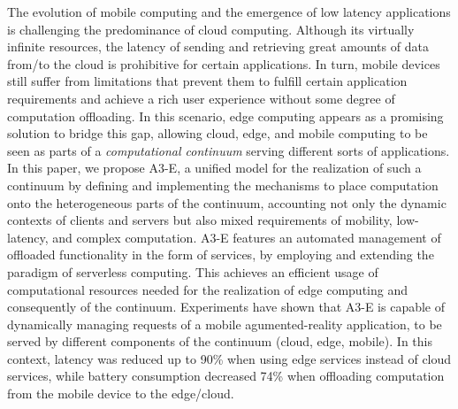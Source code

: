 
The evolution of mobile computing and the emergence of low latency applications is challenging the predominance of cloud computing.
Although its virtually infinite resources, the latency of sending and retrieving great amounts of data from/to the cloud is prohibitive for certain applications. In turn, mobile devices still suffer from limitations that prevent them to fulfill certain application requirements and achieve a rich user experience without some degree of computation offloading.
In this scenario, edge computing appears as a promising solution to bridge this gap, allowing cloud, edge, and mobile computing to be seen as parts of a \textit{computational continuum} serving different sorts of applications. 
In this paper, we propose A3-E, %
a unified model for the realization of such a continuum by defining and implementing the mechanisms to place computation onto the heterogeneous parts of the continuum, accounting not only the dynamic contexts of clients and servers but also mixed requirements of mobility, low-latency, and complex computation. A3-E features an automated management of offloaded functionality in the form of services, by employing and extending the paradigm of serverless computing. This achieves an efficient usage of computational resources needed for the realization of edge computing and consequently of the continuum.
Experiments have shown that A3-E is capable of dynamically managing requests of a mobile agumented-reality application, to be served by different components of the continuum (cloud, edge, mobile). In this context, latency was reduced up to 90\% when using edge services instead of cloud services, while battery consumption decreased 74\% when offloading computation from the mobile device to the edge/cloud.%


